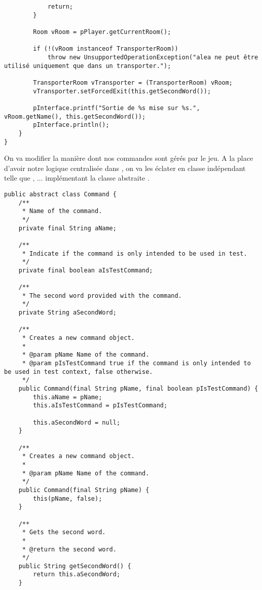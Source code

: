 \begin{exercise}[subtitle=Transporter]
\begin{verbatim}
            return;
        }

        Room vRoom = pPlayer.getCurrentRoom();

        if (!(vRoom instanceof TransporterRoom))
            throw new UnsupportedOperationException("alea ne peut être utilisé uniquement que dans un transporter.");

        TransporterRoom vTransporter = (TransporterRoom) vRoom;
        vTransporter.setForcedExit(this.getSecondWord());

        pInterface.printf("Sortie de %s mise sur %s.", vRoom.getName(), this.getSecondWord());
        pInterface.println();
    }
}
\end{verbatim}

\end{exercise}

\begin{exercise}[subtitle=Commande abstraite]

On va modifier la manière dont nos commandes sont gérés par le jeu. A la place d'avoir notre logique centralisée dans , on va les éclater en classe indépendant telle que , ... implémentant la classe abstraite .

\begin{verbatim}
public abstract class Command {
    /**
     * Name of the command.
     */
    private final String aName;

    /**
     * Indicate if the command is only intended to be used in test.
     */
    private final boolean aIsTestCommand;

    /**
     * The second word provided with the command.
     */
    private String aSecondWord;

    /**
     * Creates a new command object.
     *
     * @param pName Name of the command.
     * @param pIsTestCommand true if the command is only intended to be used in test context, false otherwise.
     */
    public Command(final String pName, final boolean pIsTestCommand) {
        this.aName = pName;
        this.aIsTestCommand = pIsTestCommand;

        this.aSecondWord = null;
    }

    /**
     * Creates a new command object.
     *
     * @param pName Name of the command.
     */
    public Command(final String pName) {
        this(pName, false);
    }

    /**
     * Gets the second word.
     *
     * @return the second word.
     */
    public String getSecondWord() {
        return this.aSecondWord;
    }


\end{verbatim}
\end{exercise}
